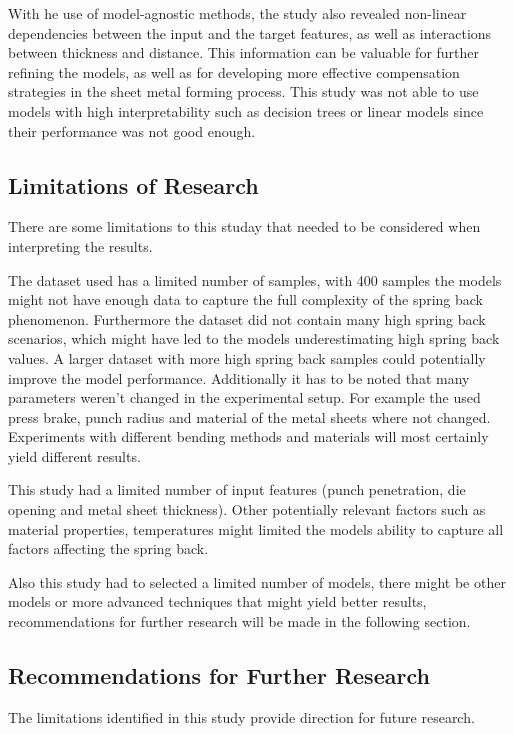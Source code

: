 With he use of model-agnostic methods, the study also revealed non-linear dependencies between the input and the
target features, as well as interactions between thickness and distance.
This information can be valuable for further refining the models, as well as for developing more effective
compensation strategies in the sheet metal forming process.
This study was not able to use models with high interpretability such as decision trees or linear models
since their performance was not good enough.

\subsection{Limitations of Research}\label{subsec:limitations-of-research}
There are some limitations to this studay that needed to be considered when interpreting the results.

The dataset used has a limited number of samples, with 400 samples the models might not have enough data to capture
the full complexity of the spring back phenomenon.
Furthermore the dataset did not contain many high spring back scenarios, which might have led to the models
underestimating high spring back values.
A larger dataset with more high spring back samples could potentially improve the model performance.
Additionally it has to be noted that many parameters weren't changed in the experimental setup.
For example the used press brake, punch radius and material of the metal sheets where not changed.
Experiments with different bending methods and materials will most certainly yield different results.

This study had a limited number of input features (punch penetration, die opening and
metal sheet thickness).
Other potentially relevant factors such as material properties, temperatures might limited the models ability to
capture all factors affecting the spring back.

Also this study had to selected a limited number of models,
there might be other models or more advanced techniques that might yield better results, recommendations for further
research will be made in the following section.

\subsection{Recommendations for Further Research}\label{subsec:recommendations-for-further-research}
The limitations identified in this study provide direction for future research.

